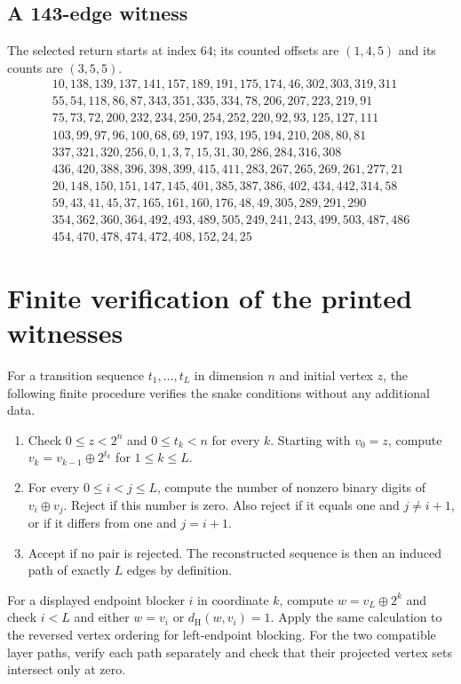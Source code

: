 \documentclass[11pt,a4paper]{article}
\theoremstyle{definition}
\theoremstyle{remark}
\newcommand{\Ham}{d_{\mathrm H}}
\begin{document}
\subsection{A 143-edge witness}
The selected return starts at index $64$; its counted offsets are $(1,4,5)$ and its counts are $(3,5,5)$.
\[
\begin{gathered}
10,138,139,137,141,157,189,191,175,174,46,302,303,319,311\\
55,54,118,86,87,343,351,335,334,78,206,207,223,219,91\\
75,73,72,200,232,234,250,254,252,220,92,93,125,127,111\\
103,99,97,96,100,68,69,197,193,195,194,210,208,80,81\\
337,321,320,256,0,1,3,7,15,31,30,286,284,316,308\\
436,420,388,396,398,399,415,411,283,267,265,269,261,277,21\\
20,148,150,151,147,145,401,385,387,386,402,434,442,314,58\\
59,43,41,45,37,165,161,160,176,48,49,305,289,291,290\\
354,362,360,364,492,493,489,505,249,241,243,499,503,487,486\\
454,470,478,474,472,408,152,24,25
\end{gathered}
\]
\section{Finite verification of the printed witnesses}\label{app:finite-check}
For a transition sequence $t_1,\ldots,t_L$ in dimension $n$ and initial vertex $z$, the following finite procedure verifies the snake conditions without any additional data.
\begin{enumerate}
\item Check $0\le z<2^n$ and $0\le t_k<n$ for every $k$. Starting with $v_0=z$, compute $v_k=v_{k-1}\oplus2^{t_k}$ for $1\le k\le L$.
\item For every $0\le i<j\le L$, compute the number of nonzero binary digits of $v_i\oplus v_j$. Reject if this number is zero. Also reject if it equals one and $j\ne i+1$, or if it differs from one and $j=i+1$.
\item Accept if no pair is rejected. The reconstructed sequence is then an induced path of exactly $L$ edges by definition.
\end{enumerate}
For a displayed endpoint blocker $i$ in coordinate $k$, compute $w=v_L\oplus2^k$ and check $i<L$ and either $w=v_i$ or $\Ham(w,v_i)=1$. Apply the same calculation to the reversed vertex ordering for left-endpoint blocking. For the two compatible layer paths, verify each path separately and check that their projected vertex sets intersect only at zero.
\end{document}
